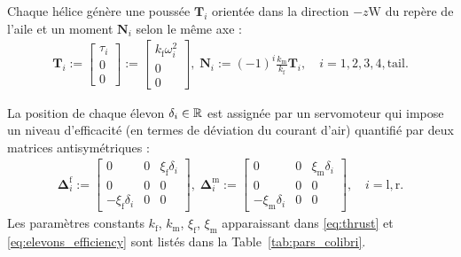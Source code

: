 Chaque hélice génère une poussée $\boldsymbol{T}_i$ orientée dans la direction $-z{\text{W}}$ du repère de l'aile et un moment $\boldsymbol{N}_i$ selon le même axe :
\begin{align}
\label{eq:thrustcolibri}
\boldsymbol{T}_{i} \!:=\! \begin{bmatrix} \tau_{i} \\ 0 \\ 0 \end{bmatrix} \!:=\!
\begin{bmatrix} k_{\text{f}}\omega_{i}^{2} \\ 0 \\ 0 \end{bmatrix}\! , \;
\boldsymbol{N}_{i} \!:=\! (-1)^{i}  \frac{k_{\text{m}} }{k_{\text{f}}}\boldsymbol{T}_{i}, \quad i=1,2,3,4,\text{tail} .
\end{align}  

La position de chaque élevon $\delta_i \in {\mathbb R}$ est assignée par un servomoteur qui impose un niveau d'efficacité (en termes de déviation du courant d'air) quantifié par deux matrices antisymétriques :
\begin{align}
\label{eq:elevons_efficiency_colibri}
    \boldsymbol{\Delta}^{\text{f}}_{i} \!:=\! \begin{bmatrix} 0 & 0 & \xi_{\text{f}}\delta_{i} \\ 0 & 0 & 0 \\ -\xi_{\text{f}}\delta_{i} & 0 & 0 \end{bmatrix}\! ,\;
    \boldsymbol{\Delta}^{\text{m}}_{i} \!:=\! \begin{bmatrix} 0 & 0 & \xi_{\text{m}}\delta_{i} \\ 0 & 0 & 0 \\ -\xi_{\text{m}}\delta_{i} & 0 & 0 \end{bmatrix} \!, \quad i=\text{l},\text{r}.
\end{align}
 Les paramètres constants $k_{\text{f}}$, $k_{\text{m}}$, $\xi_{\text{f}}$, $\xi_{\text{m}}$ apparaissant dans \eqref{eq:thrust} et \eqref{eq:elevons_efficiency} sont listés dans la Table~\ref{tab:pars_colibri}.


